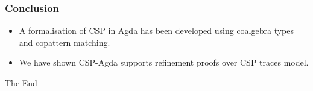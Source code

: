 \documentclass{beamer}
\begin{document}

\begin{frame}
\frametitle{Conclusion}
\begin{itemize}
\item  A formalisation of CSP in Agda has been developed using coalgebra types and copattern matching.  

\item We have shown CSP-Agda supports refinement proofs over CSP traces model.
\end{itemize}
\end{frame}












\begin{frame}
\Huge{\centerline{The End}}
\end{frame}
\end{document}
